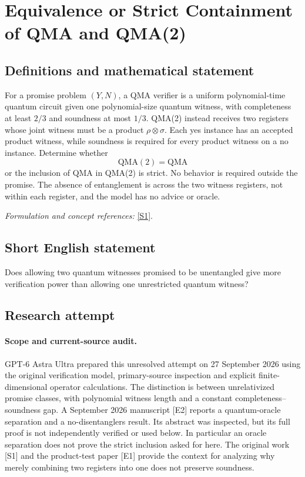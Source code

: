 \documentclass[11pt]{article}
\begin{document}
\section*{\texorpdfstring{Equivalence or Strict Containment of QMA and QMA(2)}{Equivalence or Strict Containment of QMA and QMA(2)}}\label{263}
\subsection{Definitions and mathematical statement}
For a promise problem $(Y,N)$, a QMA verifier is a uniform polynomial-time quantum circuit given one polynomial-size quantum witness, with completeness at least $2/3$ and soundness at most $1/3$. QMA(2) instead receives two registers whose joint witness must be a product $\rho\otimes\sigma$. Each yes instance has an accepted product witness, while soundness is required for every product witness on a no instance. Determine whether
\[
 \mathrm{QMA}(2)=\mathrm{QMA}
\]
or the inclusion of QMA in QMA(2) is strict. No behavior is required outside the promise. The absence of entanglement is across the two witness registers, not within each register, and the model has no advice or oracle.
\par\smallskip\textit{Formulation and concept references:} \href{https://theoryofcomputing.org/articles/v005a001/v005a001.pdf}{[S1]}.

\subsection{Short English statement}
Does allowing two quantum witnesses promised to be unentangled give more verification power than allowing one unrestricted quantum witness?
\subsection{Research attempt}
\paragraph{Scope and current-source audit.}
GPT-6 Astra Ultra prepared this unresolved attempt on 27 September 2026
using the original verification model, primary-source inspection and
explicit finite-dimensional operator calculations. The distinction is
between unrelativized promise classes, with polynomial witness length
and a constant completeness--soundness gap. A September 2026 manuscript
[E2] reports a quantum-oracle separation and a no-disentanglers result.
Its abstract was inspected, but its full proof is not independently
verified or used below. In particular an oracle separation does not
prove the strict inclusion asked for here. The original work [S1] and
the product-test paper [E1] provide the context for analyzing why merely
combining two registers into one does not preserve soundness.
\end{document}
